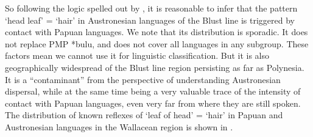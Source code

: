 So following the logic spelled out by \citet[14--16]{Klamer2019},
it is reasonable to infer that the pattern ‘head leaf’ = ‘hair’
in Austronesian languages  of the Blust line is triggered
by contact with Papuan languages.
We note that its distribution is sporadic.
It does not replace PMP *bulu,
and does not cover all languages in any subgroup.
These factors mean we cannot use it for linguistic classification.
But it is also geographically widespread  of the Blust line
region persisting as far  as Polynesia.
It is a “contaminant” from the perspective of understanding Austronesian
dispersal, while at the same time being a very valuable trace of the intensity
of contact with Papuan languages,
even very far from where they are still spoken.
The distribution of known reflexes of ‘leaf of head’ = ‘hair’
in Papuan and Austronesian languages in the Wallacean region is shown in
.
